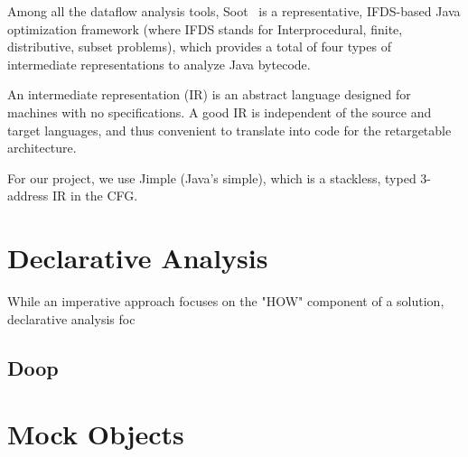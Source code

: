 Among all the dataflow analysis tools, Soot~\cite{Vallee-Rai:1999:SJB:781995.782008} is a representative, IFDS-based Java optimization framework (where IFDS stands for Interprocedural, finite, distributive, subset problems), which provides a total of four types of intermediate representations to analyze Java bytecode. 

An intermediate representation (IR) is an abstract language designed for machines with no specifications. A good IR is independent of the source and target languages, and thus convenient to translate into code for the retargetable architecture.

For our project, we use Jimple (Java's simple), which is a stackless, typed 3-address IR in the CFG.

\section{Declarative Analysis}

While an imperative approach focuses on the "HOW" component of a solution, declarative analysis foc

\subsection{Doop}

\section{Mock Objects} 
